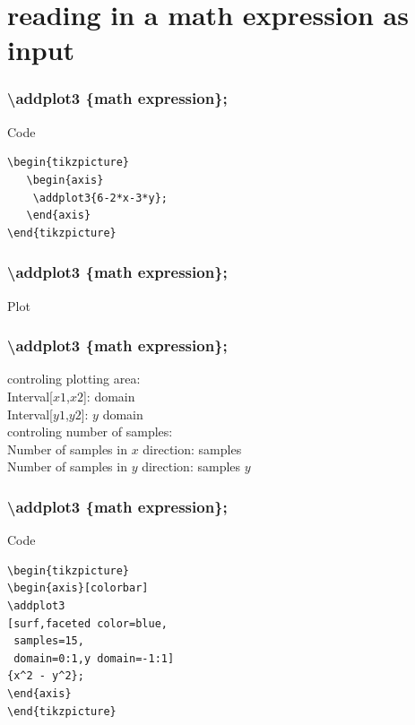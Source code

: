 \documentclass{beamer}
\begin{document}
\section{reading in a math expression as input}
\begin{frame}[fragile]
   \frametitle{\color{blue}\textbackslash addplot3 \color{black} \{math expression\};}
\begin{block}{Code}
\begin{verbatim}
\begin{tikzpicture}
   \begin{axis}
    \addplot3{6-2*x-3*y}; 
   \end{axis}
\end{tikzpicture}
\end{verbatim}
\end{block}
\end{frame}
\begin{frame}[fragile]
\frametitle{\color{blue}\textbackslash addplot3 \color{black} \{math expression\};}
\begin{block}{Plot}
\end{block}
\end{frame}
\begin{frame}
   \frametitle{\color{blue}\textbackslash addplot3 \color{black} \{math expression\};}
controling plotting area:\\
\color{black} Interval[$x1$,$x2$]: \color{blue} domain\\
\color{black} Interval[$y1$,$y2$]: \color{blue} $y$ domain\\
\vspace{30pt}
\color{black} controling number of samples:\\ 
\color{black} Number of samples in $x$ direction: \color{blue} samples\\
\color{black} Number of samples in $y$ direction: \color{blue} samples $y$\\
\end{frame}
\begin{frame}[fragile]
   \frametitle{\color{blue}\textbackslash addplot3 \color{black} \{math expression\};}
\begin{block}{Code}
\begin{verbatim}
\begin{tikzpicture}
\begin{axis}[colorbar]
\addplot3
[surf,faceted color=blue,
 samples=15,
 domain=0:1,y domain=-1:1]
{x^2 - y^2};
\end{axis}
\end{tikzpicture}
\end{verbatim}
\end{block}
\end{frame}
\end{document}
